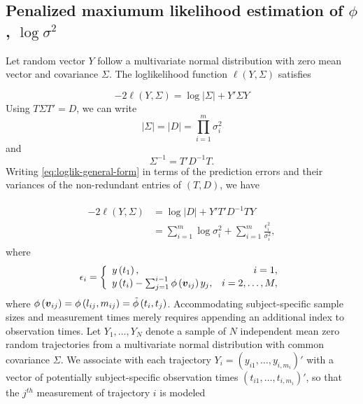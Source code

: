 \documentclass[12pt]{article}
\newcommand{\bfv}{\mbox{\boldmath $v$}}
\theoremstyle{definition}
\begin{document}
\subsection{Penalized maxiumum likelihood estimation of $\phi$, $\log\sigma^2$}

Let random vector $Y$ follow a multivariate normal distribution with zero mean vector and covariance $\Sigma$. The loglikelihood function $\ell \left( Y, \Sigma \right)$ satisfies

\begin{equation} \label{eq:loglik-general-form}
-2\ell\left( Y, \Sigma \right) = \log \vert \Sigma \vert + Y' \Sigma Y
\end{equation}
\noindent
Using $T \Sigma T' = D$, we can write 
\[
\vert \Sigma\vert = \vert D \vert = \prod_{i = 1}^m \sigma_i^2
\]
and 
\[
\Sigma^{-1} = T' D^{-1} T.
\]
Writing \ref{eq:loglik-general-form} in terms of the prediction errors and their variances of the non-redundant entries of $\left(T , D\right)$, we have

\begin{align}
\begin{split} \label{eq:loglik-cholesky-form}
-2\ell\left( Y, \Sigma \right) &= \log \vert D \vert + Y' T' D^{-1} T Y \\
&= \sum_{i = 1}^m \log \sigma_i^2  + \sum_{i = 1}^m \frac {\epsilon_i^2}{\sigma_i^2},
\end{split}
\end{align}
\noindent
where 
\begin{equation} \label{eq:loglik-cholesky-form}
\epsilon_i = \left\{\begin{array}{lr}y\left(t_1\right), & i = 1, \\
y\left(t_i\right) - \sum_{j = 1}^{i-1} \phi\left(\bfv_{ij}\right) y_j, & i= 2, \dots, M, \\
\end{array} \right.
\end{equation}
\noindent
where $\phi\left(\bfv_{ij}\right) = \phi\left(l_{ij},m_{ij}\right) = \tilde{\phi}\left(t_i,t_j\right)$.  Accommodating subject-specific sample sizes and measurement times merely requires appending an additional index to observation times. Let  $Y_1, \dots, Y_N$ denote a sample of $N$ independent mean zero random trajectories from a  multivariate normal distribution with common covariance $\Sigma$. We associate with each trajectory $Y_i = \left(y_{i1}, \dots, y_{i,m_i}\right)'$ with a vector of potentially subject-specific observation times $\left(t_{i1}, \dots, t_{i,m_i}\right)'$, so that the $j^{th}$ measurement of trajectory $i$ is modeled
\end{document}

